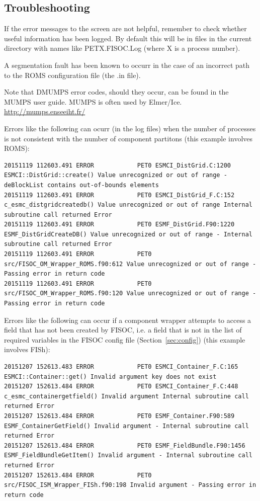 \documentclass[11pt]{article}
\begin{document}
\subsection{Troubleshooting}

If the error messages to the screen are not helpful, remember to check whether useful 
information has been logged.  By default this will be in files in the current directory 
with names like PETX.FISOC.Log (where X is a process number).

A segmentation fault has been known to occurr in the case of an incorrect path to the ROMS 
configuration file (the .in file). 

Note that DMUMPS error codes, should they occur, can be found in the MUMPS user guide.
MUMPS is often used by Elmer/Ice.
\url{http://mumps.enseeiht.fr/}

Errors like the following can ocurr (in the log files) when the number of processes is 
not consistent with the number of component partitons (this example involves ROMS):
\begin{lstlisting}
20151119 112603.491 ERROR            PET0 ESMCI_DistGrid.C:1200 ESMCI::DistGrid::create() Value unrecognized or out of range - deBlockList contains out-of-bounds elements
20151119 112603.491 ERROR            PET0 ESMCI_DistGrid_F.C:152 c_esmc_distgridcreatedb() Value unrecognized or out of range Internal subroutine call returned Error
20151119 112603.491 ERROR            PET0 ESMF_DistGrid.F90:1220 ESMF_DistGridCreateDB() Value unrecognized or out of range - Internal subroutine call returned Error
20151119 112603.491 ERROR            PET0 src/FISOC_OM_Wrapper_ROMS.f90:612 Value unrecognized or out of range - Passing error in return code
20151119 112603.491 ERROR            PET0 src/FISOC_OM_Wrapper_ROMS.f90:120 Value unrecognized or out of range - Passing error in return code
\end{lstlisting}

Errors like the following can occur if a component wrapper attempts to access a field 
that has not been created by FISOC, i.e. a field that is not in the list of
required variables in the FISOC config file (Section~\ref{sec:config}) 
(this example involves FISh):
\begin{lstlisting}
20151207 152613.483 ERROR            PET0 ESMCI_Container_F.C:165 ESMCI::Container::get() Invalid argument key does not exist
20151207 152613.484 ERROR            PET0 ESMCI_Container_F.C:448 c_esmc_containergetfield() Invalid argument Internal subroutine call returned Error
20151207 152613.484 ERROR            PET0 ESMF_Container.F90:589 ESMF_ContainerGetField() Invalid argument - Internal subroutine call returned Error
20151207 152613.484 ERROR            PET0 ESMF_FieldBundle.F90:1456 ESMF_FieldBundleGetItem() Invalid argument - Internal subroutine call returned Error
20151207 152613.484 ERROR            PET0 src/FISOC_ISM_Wrapper_FISh.f90:198 Invalid argument - Passing error in return code
\end{lstlisting}
\end{document}
